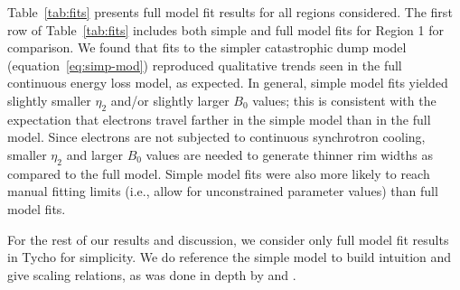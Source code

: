 \documentclass[iop, apj, numberedappendix]{emulateapj}
\begin{document}

Table~\ref{tab:fits} presents full model fit results for all regions
considered.  The first row of Table~\ref{tab:fits} includes both simple and
full model fits for Region 1 for comparison.  We found that fits to the simpler
catastrophic dump model (equation~\eqref{eq:simp-mod}) reproduced qualitative
trends seen in the full continuous energy loss model, as expected.  In general,
simple model fits yielded slightly smaller $\eta_2$ and/or slightly larger
$B_0$ values; this is consistent with the expectation that electrons travel
farther in the simple model than in the full model. Since electrons are not
subjected to continuous synchrotron cooling, smaller $\eta_2$ and larger $B_0$
values are needed to generate thinner rim widths as compared to the full model.
Simple model fits were also more likely to reach manual fitting limits (i.e.,
allow for unconstrained parameter values) than full model fits.

For the rest of our results and discussion, we consider only full model
fit results in Tycho for simplicity.  We do reference the simple model to build
intuition and give scaling relations, as was done in depth by
\citet{parizot2006} and .
\end{document}

